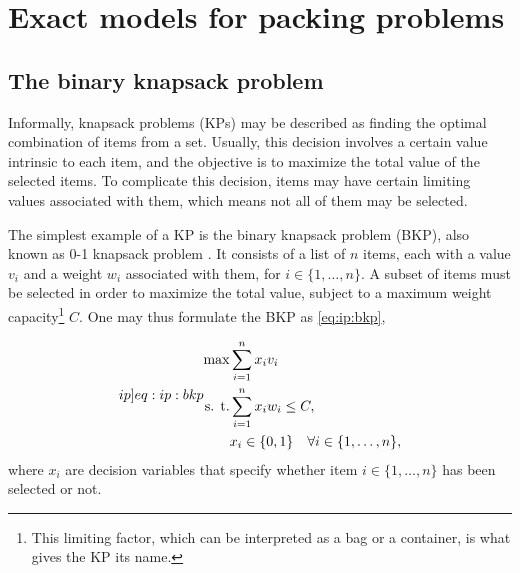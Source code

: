 \section{Exact models for packing problems}

\subsection{The binary knapsack problem}

Informally, knapsack problems (KPs) may be described as finding the optimal combination of items from a set. Usually, this decision involves a certain value intrinsic to each item, and the objective is to maximize the total value of the selected items. To complicate this decision, items may have certain limiting values associated with them, which means not all of them may be selected.

The simplest example of a KP is the binary knapsack problem (BKP), also known as 0-1 knapsack problem \cite{ASSI2018}. It consists of a list of $n$ items, each with a value $v_i$ and a weight $w_i$ associated with them, for $i \in \{1,\dots,n\}$. A subset of items must be selected in order to maximize the total value, subject to a maximum weight capacity\footnote{This limiting factor, which can be interpreted as a bag or a container, is what gives the KP its name.} $C$. One may thus formulate the BKP as \cref{eq:ip:bkp},

\begin{align}
    \label[ip]{eq:ip:bkp}
    \begin{split}
        \max &\sum_{i=1}^{n}x_iv_i\\
        \textrm{s. t.}& \sum_{i=1}^{n}x_iw_i \leq C,\\
        &x_i \in \{0,1\} \quad \forall i \in \{1,\dots,n\},
    \end{split}
\end{align}
where $x_i$ are decision variables that specify whether item $i \in \{1,\dots,n\}$ has been selected or not.
% 


